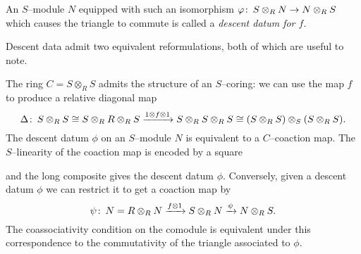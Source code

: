 \begin{definition}
An $S$--module $N$ equipped with such an isomorphism $\varphi\colon\thinspace S \otimes_R N \to N \otimes_R S$ which causes the triangle to commute is called a \textit{descent datum for $f$}.
\end{definition}

Descent data admit two equivalent reformulations, both of which are useful to note.
\begin{remark}
The ring $C = S \otimes_R S$ admits the structure of an $S$--coring: we can use the map $f$ to produce a relative diagonal map \[\Delta\colon\thinspace S \otimes_R S \cong S \otimes_R R \otimes_R S \xrightarrow{1 \otimes f \otimes 1} S \otimes_R S \otimes_R S \cong (S \otimes_R S) \otimes_S (S \otimes_R S).\]  The descent datum $\phi$ on an $S$--module $N$ is equivalent to a $C$--coaction map.  The $S$--linearity of the coaction map is encoded by a square
\begin{center}
\end{center}
and the long composite gives the descent datum $\phi$.  Conversely, given a descent datum $\phi$ we can restrict it to get a coaction map by \[\psi\colon\thinspace N = R \otimes_R N \xrightarrow{f \otimes 1} S \otimes_R N \xrightarrow{\psi} N \otimes_R S.\]  The coassociativity condition on the comodule is equivalent under this correspondence to the commutativity of the triangle associated to $\phi$.
\end{remark}

